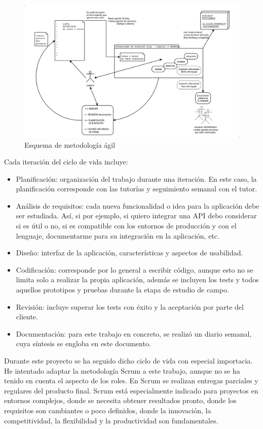 \begin{figure}[H]
	\centering
	\includegraphics[width=14cm]{./images/metodologia-agil.png}
	\caption{Esquema de metodología ágil} \label{fig:metodologia}
\end{figure}

\vspace*{0.1in}
Cada iteración del ciclo de vida incluye:
\begin{itemize}
	\item Planificación: organización del trabajo durante una iteración. En este caso, la planificación corresponde con las tutorías y seguimiento semanal con el tutor.
	\item Análisis de requisitos: cada nueva funcionalidad o idea para la aplicación debe ser estudiada. Así, si por ejemplo, si quiero integrar una API debo considerar si es útil o no, si es compatible con los entornos de producción y con el lenguaje, documentarme para su integración en la aplicación, etc.
	\item Diseño: interfaz de la aplicación, características y aspectos de usabilidad.
	\item Codificación: corresponde por lo general a escribir código, aunque esto no se limita solo a realizar la propia aplicación, además se incluyen los tests y todos aquellos prototipos y pruebas durante la etapa de estudio de campo.
	\item Revisión: incluye superar los tests con éxito y la aceptación por parte del cliente.
	\item Documentación: para este trabajo en concreto, se realizó un diario semanal, cuya síntesis se engloba en este documento.
\end{itemize}

Durante este proyecto se ha seguido dicho ciclo de vida con especial importacia. He intentado adaptar la metodología Scrum a este trabajo, aunque no se ha tenido en cuenta  el aspecto de los roles. En Scrum se realizan entregas parciales y regulares del producto final. Scrum está especialmente indicado para proyectos en entornos complejos, donde se necesita obtener resultados pronto, donde los requisitos son cambiantes o poco definidos, donde la innovación, la competitividad, la flexibilidad y la productividad son fundamentales. \\


